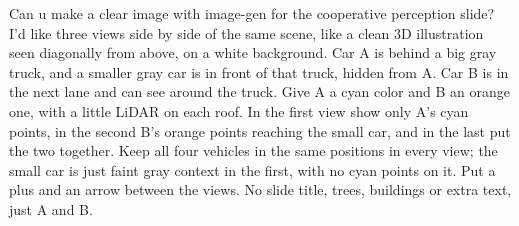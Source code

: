 Can u make a clear image with image-gen for the cooperative perception slide? I'd like three views side by side of the same scene, like a clean 3D illustration seen diagonally from above, on a white background. Car A is behind a big gray truck, and a smaller gray car is in front of that truck, hidden from A. Car B is in the next lane and can see around the truck. Give A a cyan color and B an orange one, with a little LiDAR on each roof. In the first view show only A's cyan points, in the second B's orange points reaching the small car, and in the last put the two together. Keep all four vehicles in the same positions in every view; the small car is just faint gray context in the first, with no cyan points on it. Put a plus and an arrow between the views. No slide title, trees, buildings or extra text, just A and B.

